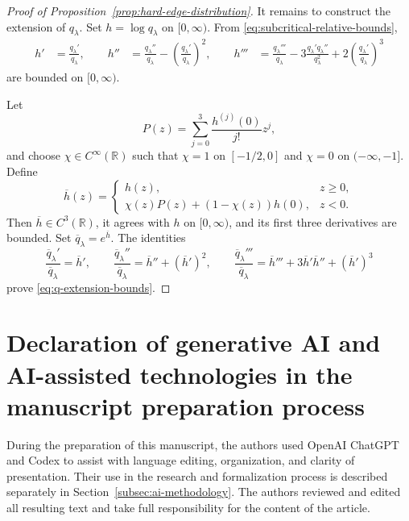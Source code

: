 \documentclass[12pt]{amsart}
\numberwithin{equation}{section}
\theoremstyle{plain}
\theoremstyle{definition}
\begin{document}
\begin{proof}[Proof of Proposition~\ref{prop:hard-edge-distribution}]
It remains to construct the extension of $q_{\lambda}$.  Set
$h=\log q_{\lambda}$ on $[0,\infty)$.  From
\eqref{eq:subcritical-relative-bounds},
\[
\begin{aligned}
 h'&=\frac{q_{\lambda}'}{q_{\lambda}},\qquad
 h''&=\frac{q_{\lambda}''}{q_{\lambda}}
      -\left(\frac{q_{\lambda}'}{q_{\lambda}}\right)^2,\qquad
 h'''&=\frac{q_{\lambda}'''}{q_{\lambda}}
      -3\frac{q_{\lambda}'q_{\lambda}''}{q_{\lambda}^2}
      +2\left(\frac{q_{\lambda}'}{q_{\lambda}}\right)^3
\end{aligned}
\]
are bounded on $[0,\infty)$.

 Let
\[
 P(z)=\sum_{j=0}^3\frac{h^{(j)}(0)}{j!}z^j,
\]
and choose $\chi\in C^\infty(\mathbb R)$ such that
$\chi=1$ on $[-1/2,0]$ and $\chi=0$ on $(-\infty,-1]$.  Define
\[
 \overline h(z)=
 \begin{cases}
  h(z),&z\ge0,\\
  \chi(z)P(z)+(1-\chi(z))h(0),&z<0.
 \end{cases}
\]
Then $\overline h\in C^3(\mathbb R)$, it agrees with $h$ on
$[0,\infty)$, and its first three derivatives are bounded.  Set
$\overline q_{\lambda}=e^{\overline h}$.  The identities
\[
 {
 \frac{\overline q_{\lambda}'}{\overline q_{\lambda}}
 =\overline h',
 \qquad
 \frac{\overline q_{\lambda}''}{\overline q_{\lambda}}
 =\overline h''+(\overline h')^2,
 \qquad
 \frac{\overline q_{\lambda}'''}{\overline q_{\lambda}}
 =\overline h'''+3\overline h'\overline h''+(\overline h')^3}
\]
prove \eqref{eq:q-extension-bounds}.
\end{proof}

%
%
%
%
%
%
%
%
%
%
%
%
%
%
%
%

\section*{Declaration of generative AI and AI-assisted technologies in the manuscript preparation process}

During the preparation of this manuscript, the authors used OpenAI
ChatGPT and Codex to assist with language editing, organization, and
clarity of presentation.  Their use in the research and formalization
process is described separately in
Section~\ref{subsec:ai-methodology}.  The authors reviewed and edited
all resulting text and take full responsibility for the content of
the article.
\end{document}
